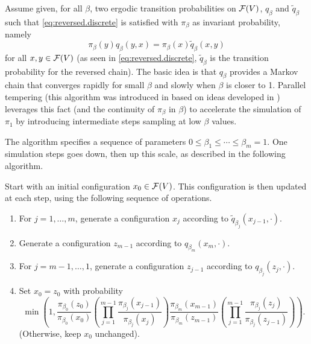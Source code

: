 \begin{enumerate}[label={\bf \alph*.}]
Assume given, for all $\beta$,  two ergodic transition probabilities on ${\mathcal F}(V)$, $q_\beta$ and $\tilde q_\beta$ such that \cref{eq:reversed.discrete} is satisfied with $\pi_\beta$ as invariant probability, namely
\begin{equation}
\label{eq:tempered.neal.1}
\pi_\beta(y) q_\beta(y,x) = \pi_\beta(x) \tilde q_\beta(x,y)
\end{equation}
for all $x,y \in {\mathcal F}(V)$ (as seen in \cref{eq:reversed.discrete}, $\tilde q_\beta$ is the transition probability for the reversed chain).   The basic idea is that $q_\beta$ provides a Markov chain that converges rapidly for small $\beta$ and slowly when $\beta$ is closer to 1. Parallel tempering (this algorithm was introduced in \citet{neal1996sampling} based on ideas developed in \citet{marinari1992simulated}) leverages this fact (and the continuity of $\pi_\beta$ in $\beta$) to accelerate the simulation of $\pi_1$ by introducing intermediate steps sampling at low $\beta$ values.

The algorithm specifies a sequence of parameters $0\leq \beta_1\leq \cdots \leq \beta_m = 1$. One simulation steps goes down, then up this scale, as described in the following algorithm.
\begin{algorithm}
Start with an initial configuration $x_0\in {\mathcal F}(V)$. This configuration is then updated  at each step, using the following sequence of operations.
\begin{enumerate}[label=(\arabic*)]
\item For $j=1, \ldots, m$, generate a configuration $x_j$ according to $\tilde q_{\beta_{j}}(x_{j-1}, \cdot)$.
\item Generate a configuration $z_{m-1}$ according to $q_{\beta_m}(x_m, \cdot)$. 
\item For $j = m-1, \ldots, 1$, generate a configuration $z_{j-1}$ according to $q_{\beta_j}(z_j, \cdot)$.
\item Set $x_0 = z_0$ with probability
\[
\min\left(1, \frac{\pi_{\beta_0}(z_0)}{\pi_{\beta_0}(x_0)}
\left(\prod_{j=1}^{m-1}  \frac{\pi_{\beta_j}(x_{j-1})}{\pi_{\beta_{j}}(x_{j})}\right) \frac{\pi_{\beta_{m}}(x_{m-1})}{\pi_{\beta_{m}}(z_{m-1})}
\left(
\prod_{j=1}^{m-1}  \frac{\pi_{\beta_{j}}(z_{j})}{\pi_{\beta_{j}}(z_{j-1})}
\right)\right).
\]
(Otherwise, keep $x_0$ unchanged).
\end{enumerate}
\end{algorithm}


\end{enumerate}
